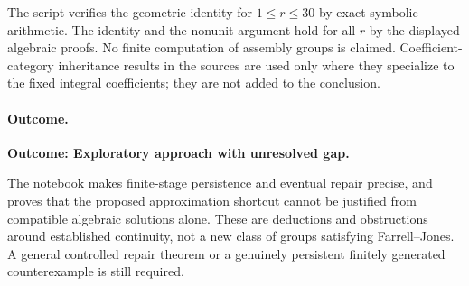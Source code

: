 \documentclass[11pt,a4paper]{article}
\numberwithin{equation}{section}
\begin{document}
The script verifies the geometric identity for $1\le r\le30$ by exact symbolic arithmetic. The identity and the nonunit argument hold for all $r$ by the displayed algebraic proofs. No finite computation of assembly groups is claimed. Coefficient-category inheritance results in the sources are used only where they specialize to the fixed integral coefficients; they are not added to the conclusion.

\paragraph{Outcome.}
\textbf{Outcome: Exploratory approach with unresolved gap.}

The notebook makes finite-stage persistence and eventual repair precise, and proves that the proposed approximation shortcut cannot be justified from compatible algebraic solutions alone. These are deductions and obstructions around established continuity, not a new class of groups satisfying Farrell--Jones. A general controlled repair theorem or a genuinely persistent finitely generated counterexample is still required.

\end{document}
